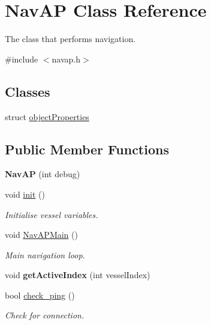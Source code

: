 \hypertarget{classNavAP}{}\section{Nav\+AP Class Reference}
\label{classNavAP}


The class that performs navigation.  




{\ttfamily \#include $<$navap.\+h$>$}

\subsection*{Classes}
\begin{DoxyCompactItemize}
\item 
struct \mbox{\hyperlink{structNavAP_1_1objectProperties}{object\+Properties}}
\end{DoxyCompactItemize}
\subsection*{Public Member Functions}
\begin{DoxyCompactItemize}
\item 
\mbox{\label{classNavAP_a3720458f3ac3dd07568fc791e6e164bb}} 
{\bfseries Nav\+AP} (int debug)
\item 
void \mbox{\hyperlink{classNavAP_a66103064c75286521189e4c4924942db}{init}} ()
\begin{DoxyCompactList}\small\item\em Initialise vessel variables. \end{DoxyCompactList}\item 
void \mbox{\hyperlink{classNavAP_a8cb9617266b590abfc1bcbfc91281b80}{Nav\+A\+P\+Main}} ()
\begin{DoxyCompactList}\small\item\em Main navigation loop. \end{DoxyCompactList}\item 
\mbox{\label{classNavAP_a076f2beded7475dc79cdbaed06041b95}} 
void {\bfseries get\+Active\+Index} (int vessel\+Index)
\item 
bool \mbox{\hyperlink{classNavAP_af3df468aafedfd4237c65cf456fed706}{check\+\_\+ping}} ()
\begin{DoxyCompactList}\small\item\em Check for connection. \end{DoxyCompactList}\end{DoxyCompactItemize}
